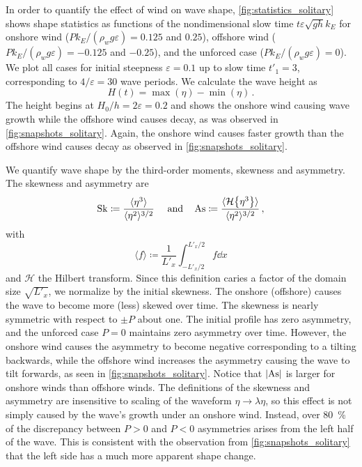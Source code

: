 \documentclass{jfm}
\DeclareMathOperator{\Sk}{Sk}
\DeclareMathOperator{\As}{As}
\newcommand{\hilbert}{\mathcal{H}}
\renewcommand*{\epsilon}{\varepsilon}
\begin{document}
In order to quantify the effect of wind on wave shape,
\cref{fig:statistics_solitary} shows shape statistics as functions of
the nondimensional slow time $t \epsilon \sqrt{g h} k_E$ for onshore
wind ($P k_E/(\rho_w g \epsilon) = 0.125$ and $0.25$), offshore wind ($P
k_E/(\rho_w g \epsilon) = -0.125$ and $-0.25$), and the unforced case
($P k_E/(\rho_w g \epsilon) = 0$).
We plot all cases for initial steepness $\epsilon = 0.1$ up to slow
time $t'_1 = 3$, corresponding to $4/\epsilon = 30$ wave periods.
We calculate the  wave height as
\begin{equation}
  H(t) = \max(\eta) - \min(\eta) \,.
  \label{eq:height_def}
\end{equation}
The height  begins at $H_0/h = 2
\epsilon = 0.2$ and shows the onshore wind
causing wave growth while the offshore wind causes decay, as was
observed in \cref{fig:snapshots_solitary}.
Again, the onshore wind causes faster growth than the offshore wind
causes decay as observed in \cref{fig:snapshots_solitary}.

We quantify wave shape by the third-order moments, skewness and
asymmetry.
The  skewness and
 asymmetry are
\begin{equation}
  \Sk \coloneqq \frac{\langle \eta^3 \rangle}{\langle \eta^2
  \rangle^{3/2}} \
  \qq{and}
  \As \coloneqq \frac{\langle \hilbert \Bqty{\eta^3} \rangle}{\langle
    \eta^2 \rangle^{3/2}} \,,
  \label{eq:shape_stats_def}
\end{equation}
with
\begin{equation}
  \langle f \rangle \coloneqq \frac{1}{L'_x} \int_{-L'_x/2}^{L'_x/2} f
  \dd{x}
\end{equation}
and $\hilbert$ the Hilbert transform.
Since this definition caries a factor of the
domain size $\sqrt{L'_x}$, we normalize by the initial skewness.
The onshore (offshore) causes the wave to become more (less) skewed over
time.
The skewness is nearly symmetric with respect to $\pm P$ about one.
The initial profile has zero asymmetry, and the unforced case
$P=0$ maintains zero asymmetry over time.
However, the onshore wind causes the asymmetry to become negative
corresponding to a tilting backwards, while the offshore wind increases
the asymmetry causing the wave to tilt forwards, as seen in
\cref{fig:snapshots_solitary}.
Notice that $\abs{\As}$ is larger for onshore winds than offshore winds.
The definitions of the skewness and asymmetry are insensitive to scaling
of the waveform $\eta \to \lambda \eta$, so this effect is not simply
caused by the wave's growth under an onshore wind.
Instead, over \SI{80}{\percent} of the discrepancy between $P>0$
and $P<0$ asymmetries arises from the left half of the wave.
This is consistent with the observation from
\cref{fig:snapshots_solitary} that the left side has a much more
apparent shape change.
\end{document}

